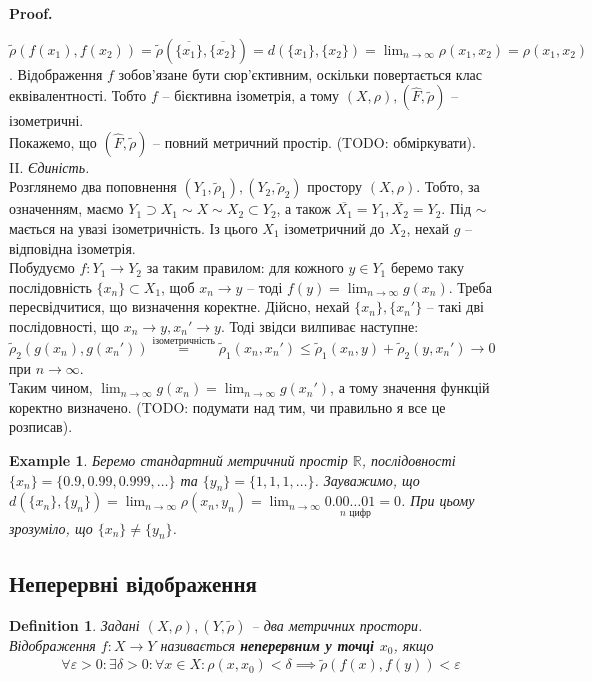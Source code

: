 \documentclass[a4paper, 10pt]{article}
\makeatletter
\theoremstyle{theoremdd}
\theoremstyle{theoremdd}
\newtheorem{definition}[theorem]{Definition}
\theoremstyle{theoremdd}
\theoremstyle{theoremdd}
\newtheorem{example}[theorem]{Example}
\theoremstyle{theoremdd}
\theoremstyle{theoremdd}
\theoremstyle{theoremdd}
\theoremstyle{theoremdd}
\renewenvironment{proof}[1][Proof.\\]{\par
\pushQED{\hfill \qed}%
\normalfont \topsep6\p@\@plus6\p@\relax
\trivlist
\item\relax
{\bfseries
#1\@addpunct{.}}\hspace\labelsep\ignorespaces
}{%
\popQED\endtrivlist\@endpefalse
}
\makeatother
\begin{document}
\begin{proof}
$\tilde{\rho}(f(x_1),f(x_2)) = \tilde{\rho}( \overline{\{x_1\}},\overline{\{x_2\}} ) = d( \{x_1\}, \{x_2\} ) = \displaystyle \lim_{n \to \infty} \rho(x_1,x_2) = \rho(x_1,x_2)$. Відображення $f$ зобов'язане бути сюр'єктивним, оскільки повертається клас еквівалентності. Тобто $f$ -- бієктивна ізометрія, а тому $(X,\rho), (\hat{F},\tilde{\rho})$ -- ізометричні.\\
Покажемо, що $(\hat{F},\tilde{\rho})$ -- повний метричний простір. (TODO: обміркувати).
\bigskip \\
II. \textit{Єдиність.}\\
Розглянемо два поповнення $(Y_1,\tilde{\rho}_1), (Y_2,\tilde{\rho}_2)$ простору $(X,\rho)$. Тобто, за означенням, маємо $Y_1 \supset X_1 \sim X \sim X_2 \subset Y_2$, а також $\overline{X_1} = Y_1, \overline{X_2} = Y_2$. Під $\sim$ мається на увазі ізометричність. Із цього $X_1$ ізометричний до $X_2$, нехай $g$ -- відповідна ізометрія.\\
Побудуємо $f \colon Y_1 \to Y_2$ за таким правилом: для кожного $y \in Y_1$ беремо таку послідовність $\{x_n\} \subset X_1$, щоб $x_n \to y$ -- тоді $f(y) = \displaystyle\lim_{n \to \infty} g(x_n)$. Треба пересвідчитися, що визначення коректне. Дійсно, нехай $\{x_n\}, \{x_n'\}$ -- такі дві послідовності, що $x_n \to y, x_n' \to y$. Тоді звідси вилпиває наступне:\\
$\tilde{\rho}_2 (g(x_n),g(x_n')) \overset{\text{ізометричність}}{=} \tilde{\rho}_1(x_n,x_n') \leq \tilde{\rho}_1(x_n,y) + \tilde{\rho}_2(y,x_n') \to 0$ при $n \to \infty$.\\
Таким чином, $\displaystyle\lim_{n \to \infty} g(x_n) = \lim_{n \to \infty} g(x_n')$, а тому значення функцій коректно визначено. (TODO: подумати над тим, чи правильно я все це розписав).
\end{proof}

\begin{example}
Беремо стандартний метричний простір $\mathbb{R}$, послідовності $\{x_n\} = \{0.9, 0.99, 0.999, \dots\}$ та $\{y_n\} = \{1,1,1,\dots\}$. Зауважимо, що $d(\{x_n\},\{y_n\}) = \displaystyle\lim_{n \to \infty} \rho(x_n,y_n) = \lim_{n \to \infty} 0.\underset{n \text{ цифр}}{00\dots 01} = 0$. При цьому зрозуміло, що $\{x_n\} \neq \{y_n\}$.
\end{example}

\subsection{Неперервні відображення}
\begin{definition}
Задані $(X,\rho), (Y,\tilde{\rho})$ -- два метричних простори.\\
Відображення $f \colon X \to Y$ називається \textbf{неперервним у точці $x_0$}, якщо
\begin{align*}
\forall \varepsilon > 0: \exists \delta > 0: \forall x \in X: \rho(x,x_0) < \delta \implies \tilde{\rho}(f(x),f(y)) < \varepsilon
\end{align*}
\end{definition}
\end{document}
